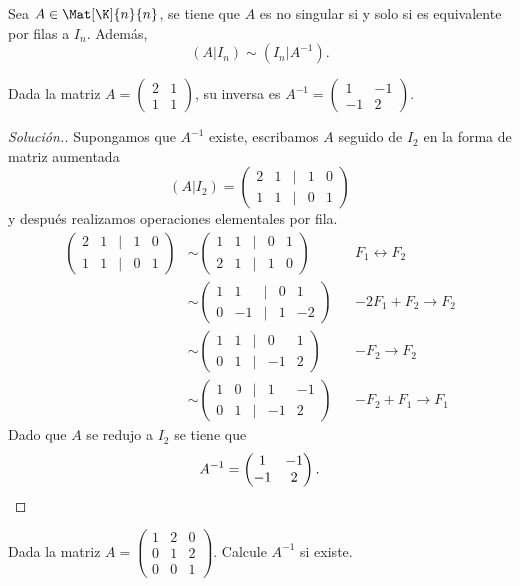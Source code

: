 \documentclass[compacto,10pt]{pubciencias-notas}
\begin{document}
\begin{teo}
    Sea $A \in \Mat[\K]{n}{n}$, se tiene que $A$ es no singular si y solo si es equivalente por filas a $I_n$. Además,
    \[
        (A|I_n) \sim (I_n|A^{-1}).
    \]
\end{teo}
\begin{ejem} 
Dada la matriz $A = \begin{pmatrix}2&1\\1&1\end{pmatrix}$, su inversa es $A^{- 1} = \begin{pmatrix}1&-1\\-1&2\end{pmatrix}$.

\begin{proof}[Solución.]\hspace{0pt} Supongamos que $A^{- 1}$ existe, escribamos $A$ seguido de $I_{2}$ en la forma de matriz aumentada
\[
    (A|I_{2}) =
    \begin{pmatrix}
    2&1&|&1&0\\
    1&1&|&0&1
    \end{pmatrix}
\]
y después realizamos operaciones elementales por fila.
\begin{align*}
    \begin{pmatrix}
    2&1&|&1&0\\
    1&1&|&0&1
    \end{pmatrix}
    &\sim
    \begin{pmatrix}
    1&1&|&0&1\\
    2&1&|&1&0
    \end{pmatrix}
    && F_{1} \leftrightarrow F_{2}\\
    &\sim
    \begin{pmatrix}
    1&1&|&0&1\\
    0&-1&|&1&-2
    \end{pmatrix}
    &&-2F_{1} + F_{2} \to F_{2}\\
    &\sim
    \begin{pmatrix}
    1&1&|&0&1\\
    0&1&|&-1&2
    \end{pmatrix}
    &&-F_{2} \to F_{2}\\
    &\sim
    \begin{pmatrix}
    1&0&|&1&-1\\
    0&1&|&-1&2
    \end{pmatrix}
    &&-F_{2} + F_{1}\to F_{1}
\end{align*}
Dado que $A$ se redujo a $I_{2}$ se tiene que
\[
    A^{- 1} = 
    \begin{pmatrix}
    1&-1\\
    -1&2
    \end{pmatrix}.\qedhere
\]
\end{proof}
\end{ejem}

\begin{ejer}\hspace{0pt} 
Dada la matriz $A = \begin{pmatrix}1&2&0\\0&1&2\\0&0&1\end{pmatrix}$. Calcule $A^{- 1}$ si existe.
\end{ejer}
\end{document}
